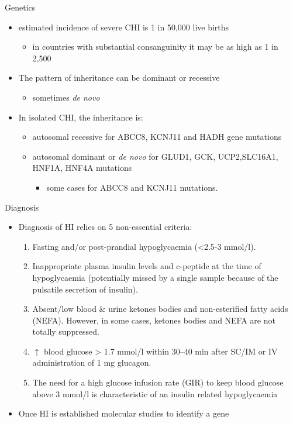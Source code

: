 \documentclass[presentation, smaller]{beamer}
\begin{document}
\begin{frame}[label={sec:org6da711d}]{Genetics}
\begin{itemize}
\item estimated incidence of severe CHI is 1 in 50,000 live births
\begin{itemize}
\item in countries with substantial consanguinity it may be as high as 1 in 2,500
\end{itemize}
\item The pattern of inheritance can be dominant or recessive
\begin{itemize}
\item sometimes \emph{de novo}
\end{itemize}
\item In isolated CHI, the inheritance is:
\begin{itemize}
\item autosomal recessive for ABCC8, KCNJ11 and HADH gene mutations
\item autosomal dominant or \emph{de novo} for GLUD1, GCK, UCP2,SLC16A1, HNF1A, HNF4A mutations
\begin{itemize}
\item some cases for ABCC8 and KCNJ11 mutations.
\end{itemize}
\end{itemize}
\end{itemize}
\end{frame}

\begin{frame}[label={sec:org42638c5}]{Diagnosis}
\begin{itemize}
\item Diagnosis of HI relies on 5 non-essential criteria:
\begin{enumerate}
\item Fasting and/or post-prandial hypoglycaemia (<2.5-3 mmol/l).
\item Inappropriate plasma insulin levels and c-peptide at the time of
hypoglycaemia (potentially missed by a single sample because of
the pulsatile secretion of insulin).
\item Absent/low blood \& urine ketones bodies and non-esterified fatty
acids (NEFA). However, in some cases, ketones bodies and NEFA are
not totally suppressed.
\item \(\uparrow\) blood glucose \textgreater{} 1.7 mmol/l within 30–40 min after
SC/IM or IV administration of 1 mg glucagon.
\item The need for a high glucose infusion rate (GIR) to keep blood
glucose above 3 mmol/l is characteristic of an insulin related
hypoglycaemia
\end{enumerate}

\item Once HI is established molecular studies to identify a gene
\end{itemize}
\end{frame}
\end{document}

